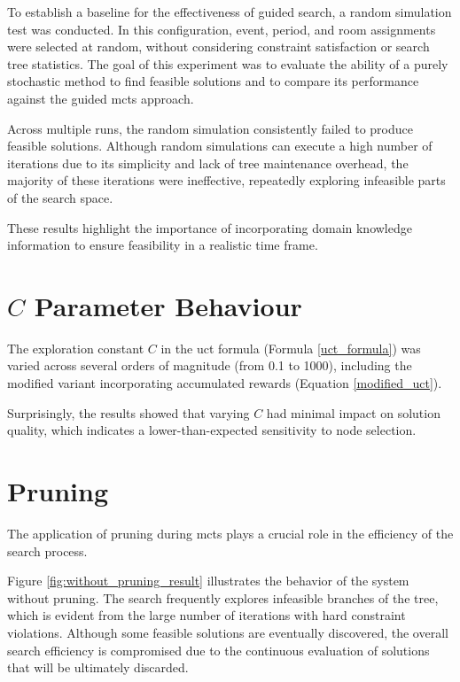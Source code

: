 To establish a baseline for the effectiveness of guided search, a random simulation test was conducted.  In this configuration, event, period, and room assignments were selected at random, without considering constraint satisfaction or search tree statistics. The goal of this experiment was to evaluate the ability of a purely stochastic method to find feasible solutions and to compare its performance against the guided \ac{mcts} approach. 

Across multiple runs, the random simulation consistently failed to produce feasible solutions. Although random simulations can execute a high number of iterations due to its simplicity and lack of tree maintenance overhead, the majority of these iterations were ineffective, repeatedly exploring infeasible parts of the search space. 

These results highlight the importance of incorporating domain knowledge information to ensure feasibility in a realistic time frame.

\section{\(C\) Parameter Behaviour}

The exploration constant \(C\) in the \ac{uct} formula (Formula \ref{uct_formula}) was varied across several orders of magnitude (from 0.1 to 1000), including the modified variant incorporating accumulated rewards (Equation \ref{modified_uct}). 

Surprisingly, the results showed that varying \(C\) had minimal impact on solution quality, which indicates a lower-than-expected sensitivity to node selection.

\section{Pruning}

The application of pruning during \ac{mcts} plays a crucial role in the efficiency of the search process.

Figure \ref{fig:without_pruning_result} illustrates the behavior of the system without pruning. The search frequently explores infeasible branches of the tree, which is evident from the large number of iterations with hard constraint violations. Although some feasible solutions are eventually discovered, the overall search efficiency is compromised due to the continuous evaluation of solutions that will be ultimately discarded.

